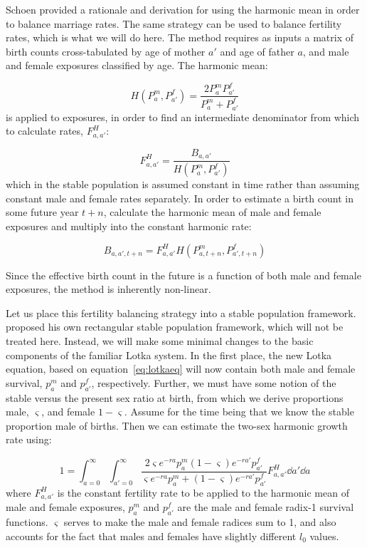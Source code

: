 
Schoen \citep{schoen1978standardized, schoen1977two, schoen1981harmonic}
provided a rationale and derivation for using the harmonic mean in order to
balance marriage rates. The same strategy can be used to balance fertility
rates, which is what we will do here. The method requires as inputs a matrix of
birth counts cross-tabulated by age of mother $a'$ and age of father $a$, and
male and female exposures classified by age. The harmonic mean: 

\begin{equation}
H(P_a^m, P_{a'}^f) = \frac{2 P_a^m P_{a'}^f}{P_a^m + P_{a'}^f}
\end{equation}
is applied to exposures, in order to find an intermediate denominator
from which to calculate rates, $F_{a,a'}^H$:
 
 \begin{equation}
 F_{a,a'}^H = \frac{B_{a,a'}}{H(P_a^m, P_{a'}^f)}
 \end{equation}
which in the stable population is assumed constant in time rather than
assuming constant male and female rates separately. In order to estimate 
a birth count in some future year $t+n$, calculate the harmonic mean
of male and female exposures and multiply into the constant harmonic rate:

 \begin{equation}
 B_{a,a',t+n} = F_{a,a'}^H H(P_{a, t+n}^m, P_{a',t+n}^f)
 \end{equation}

Since the effective birth count in the future is a function of both male and
female exposures, the method is inherently non-linear. 

Let us place this fertility balancing strategy into a stable
population framework. \citet{schoen1977two} proposed his own rectangular stable
population framework, which will not be treated here. Instead, we will make some minimal
changes to the basic components of the familiar Lotka system. In the first
place, the new Lotka equation, based on equation~\eqref{eq:lotkaeq} will now
contain both male and female survival, $p_a^m$ and $p_{a'}^f$, respectively.
Further, we must have some notion of the stable versus the present sex ratio at
birth, from which we derive proportions male, $\varsigma$, and female
$1-\varsigma$. Assume for the time being that we know the stable proportion male
of births. Then we can estimate the two-sex harmonic growth rate using:

\begin{equation}
\label{eq:lotkaH}
1 = \int _{a=0}^\infty \int _{a'=0}^\infty \frac{2 \varsigma e^{-ra} p_a^m
(1 - \varsigma) e^{-ra'} p_{a'}^f}{\varsigma e^{-ra} p_a^m  + (1 -
\varsigma) e^{-ra'} p_{a'}^f} F_{a,a'}^H \dd a' \dd a
\end{equation}
where $F_{a,a'}^H$ is the constant fertility rate to be applied to the harmonic
mean of male and female exposures, $p_a^m$ and $p_{a'}^f$ are the male
and female radix-1 survival functions. $\varsigma$ serves to make the
male and female radices sum to 1, and also accounts for the fact that males and
females have slightly different $l_0$ values. 

